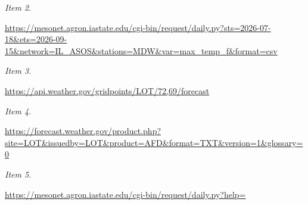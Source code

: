 \documentclass[11pt]{article}
\begin{document}
\par\noindent\textit{Item 2.}\par \href{https://mesonet.agron.iastate.edu/cgi-bin/request/daily.py?sts=2026-07-18\&ets=2026-09-15\&network=IL\_ASOS\&stations=MDW\&var=max\_temp\_f\&format=csv}{https://meso\hspace{0pt}net.agron.ia\hspace{0pt}state.edu/cg\hspace{0pt}i-bin/reques\hspace{0pt}t/daily.py?s\hspace{0pt}ts=2026-07-1\hspace{0pt}8\&ets=2026-0\hspace{0pt}9-15\&network\hspace{0pt}=IL\_ASOS\&sta\hspace{0pt}tions=MDW\&va\hspace{0pt}r=max\_temp\_f\hspace{0pt}\&format=csv}

\par\noindent\textit{Item 3.}\par \href{https://api.weather.gov/gridpoints/LOT/72,69/forecast}{https://api.\hspace{0pt}weather.gov/\hspace{0pt}gridpoints/L\hspace{0pt}OT/72,69/for\hspace{0pt}ecast}

\par\noindent\textit{Item 4.}\par \href{https://forecast.weather.gov/product.php?site=LOT\&issuedby=LOT\&product=AFD\&format=TXT\&version=1\&glossary=0}{https://fore\hspace{0pt}cast.weather\hspace{0pt}.gov/product\hspace{0pt}.php?site=LO\hspace{0pt}T\&issuedby=L\hspace{0pt}OT\&product=A\hspace{0pt}FD\&format=TX\hspace{0pt}T\&version=1\&\hspace{0pt}glossary=0}

\par\noindent\textit{Item 5.}\par \href{https://mesonet.agron.iastate.edu/cgi-bin/request/daily.py?help=}{https://meso\hspace{0pt}net.agron.ia\hspace{0pt}state.edu/cg\hspace{0pt}i-bin/reques\hspace{0pt}t/daily.py?h\hspace{0pt}elp=}
\end{document}
